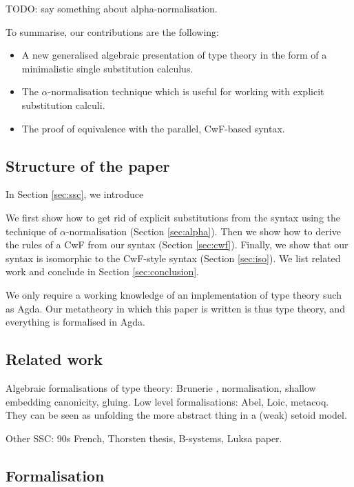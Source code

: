 \documentclass[sigplan,10pt,anonymous,review]{acmart}\settopmatter{printfolios=true,printccs=false,printacmref=false}
\begin{document}
TODO: say something about alpha-normalisation.

To summarise, our contributions are the following:
\begin{itemize}
\item A new generalised algebraic presentation of type theory in the
  form of a minimalistic single substitution calculus.
\item The $\alpha$-normalisation technique which is useful for working
  with explicit substitution calculi.
\item The proof of equivalence with the parallel, CwF-based syntax.
\end{itemize}

\subsection{Structure of the paper}

In Section \ref{sec:ssc}, we introduce 

We first show how to get rid of explicit substitutions from the syntax
using the technique of $\alpha$-normalisation (Section
\ref{sec:alpha}). Then we show how to derive the rules of a CwF from
our syntax (Section \ref{sec:cwf}). Finally, we show that our syntax
is isomorphic to the CwF-style syntax (Section \ref{sec:iso}). We list
related work and conclude in Section \ref{sec:conclusion}.

We only require a working knowledge of an implementation of type
theory such as Agda. Our metatheory in which this paper is written is
thus type theory, and everything is formalised in Agda.

\subsection{Related work}

Algebraic formalisations of type theory: Brunerie
\cite{initiality-agda} \cite{DBLP:conf/popl/AltenkirchK16},
normalisation, shallow embedding canonicity, gluing. Low level
formalisations: Abel, Loic, metacoq. They can be seen as unfolding the
more abstract thing in a (weak) setoid model.

Other SSC: 90s French, Thorsten thesis, B-systems, Luksa paper.


\subsection{Formalisation}
\end{document}

